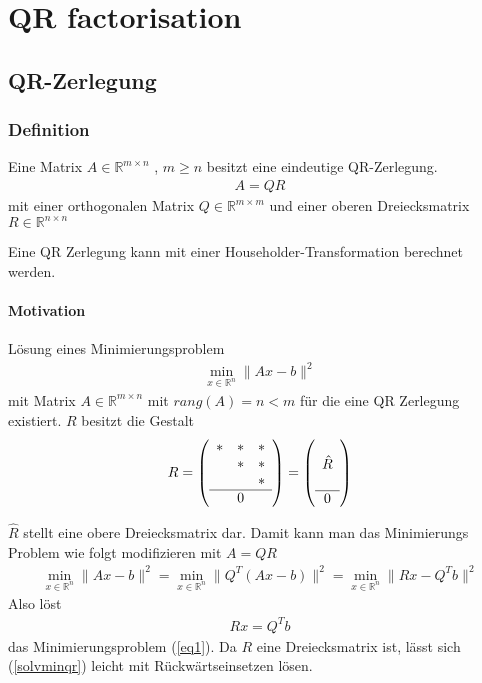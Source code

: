\chapter{QR factorisation}

\section{QR-Zerlegung}
\subsection{Definition}
Eine Matrix $A \in \mathbb{R}^{m \times n}$ , $m \ge n$ besitzt eine eindeutige QR-Zerlegung.
\begin{align}
	A = QR
\end{align}
mit einer orthogonalen Matrix $ Q \in \mathbb{R}^{m \times m} $ und einer oberen Dreiecksmatrix $ R \in \mathbb{R}^{n \times n}$ \cite{num1}

Eine QR Zerlegung kann mit einer Householder-Transformation berechnet werden.

\subsubsection{Motivation}
Lösung eines Minimierungsproblem
\begin{align}
	\min_{x \in \mathbb{R}^n} \|Ax-b\|^2 \label{eq1}
\end{align}
mit Matrix $A \in \mathbb{R}^{m\times n}$ mit $rang(A) = n < m$ für die eine QR Zerlegung existiert.
$R$ besitzt die Gestalt 
\begin{align*}
	R=	
	\left(\begin{array}{ccc}
		*&*&* \\ 
		&*&* \\ 
		& &* \\ \hline
		& 0 &
	\end{array} \right)
	=
	\left(\begin{array}{c}
	 \\ 
	\hat{R} \\ 
	 \\ \hline
	0
	\end{array} \right) 
\end{align*}

$\hat{R}$ stellt eine obere Dreiecksmatrix dar.
Damit kann man das Minimierungs Problem wie folgt modifizieren mit $A=QR$
\begin{align}
		\min_{x \in \mathbb{R}^n} \|Ax-b\|^2 =
		\min_{x \in \mathbb{R}^n} \|Q^T(Ax-b)\|^2 =
		\min_{x \in \mathbb{R}^n} \|Rx-Q^Tb\|^2
\end{align}
Also löst
\begin{align}
Rx=Q^Tb \label{solvminqr}
\end{align}
das Minimierungsproblem (\ref{eq1}). Da $R$ eine Dreiecksmatrix ist, lässt sich (\ref{solvminqr}) leicht mit Rückwärtseinsetzen  lösen.

